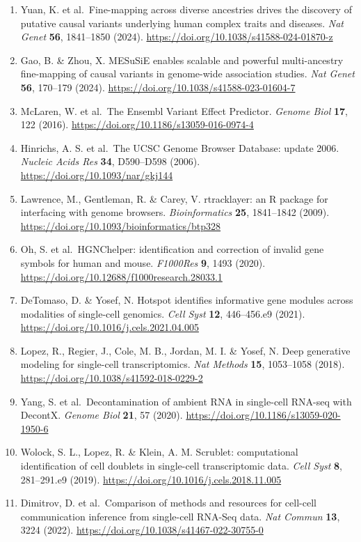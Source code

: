 \begin{enumerate}
\item
  Yuan, K. et al.~Fine-mapping across diverse ancestries drives the discovery of putative causal variants underlying human complex traits and diseases. \emph{Nat Genet} \textbf{56}, 1841--1850 (2024). \url{https://doi.org/10.1038/s41588-024-01870-z}
\item
  Gao, B. \& Zhou, X. MESuSiE enables scalable and powerful multi-ancestry fine-mapping of causal variants in genome-wide association studies. \emph{Nat Genet} \textbf{56}, 170--179 (2024). \url{https://doi.org/10.1038/s41588-023-01604-7}
\item
  McLaren, W. et al.~The Ensembl Variant Effect Predictor. \emph{Genome Biol} \textbf{17}, 122 (2016). \url{https://doi.org/10.1186/s13059-016-0974-4}
\item
  Hinrichs, A. S. et al.~The UCSC Genome Browser Database: update 2006. \emph{Nucleic Acids Res} \textbf{34}, D590--D598 (2006). \url{https://doi.org/10.1093/nar/gkj144}
\item
  Lawrence, M., Gentleman, R. \& Carey, V. rtracklayer: an R package for interfacing with genome browsers. \emph{Bioinformatics} \textbf{25}, 1841--1842 (2009). \url{https://doi.org/10.1093/bioinformatics/btp328}
\item
  Oh, S. et al.~HGNChelper: identification and correction of invalid gene symbols for human and mouse. \emph{F1000Res} \textbf{9}, 1493 (2020). \url{https://doi.org/10.12688/f1000research.28033.1}
\item
  DeTomaso, D. \& Yosef, N. Hotspot identifies informative gene modules across modalities of single-cell genomics. \emph{Cell Syst} \textbf{12}, 446--456.e9 (2021). \url{https://doi.org/10.1016/j.cels.2021.04.005}
\item
  Lopez, R., Regier, J., Cole, M. B., Jordan, M. I. \& Yosef, N. Deep generative modeling for single-cell transcriptomics. \emph{Nat Methods} \textbf{15}, 1053--1058 (2018). \url{https://doi.org/10.1038/s41592-018-0229-2}
\item
  Yang, S. et al.~Decontamination of ambient RNA in single-cell RNA-seq with DecontX. \emph{Genome Biol} \textbf{21}, 57 (2020). \url{https://doi.org/10.1186/s13059-020-1950-6}
\item
  Wolock, S. L., Lopez, R. \& Klein, A. M. Scrublet: computational identification of cell doublets in single-cell transcriptomic data. \emph{Cell Syst} \textbf{8}, 281--291.e9 (2019). \url{https://doi.org/10.1016/j.cels.2018.11.005}
\item
  Dimitrov, D. et al.~Comparison of methods and resources for cell-cell communication inference from single-cell RNA-Seq data. \emph{Nat Commun} \textbf{13}, 3224 (2022). \url{https://doi.org/10.1038/s41467-022-30755-0}

\end{enumerate}

